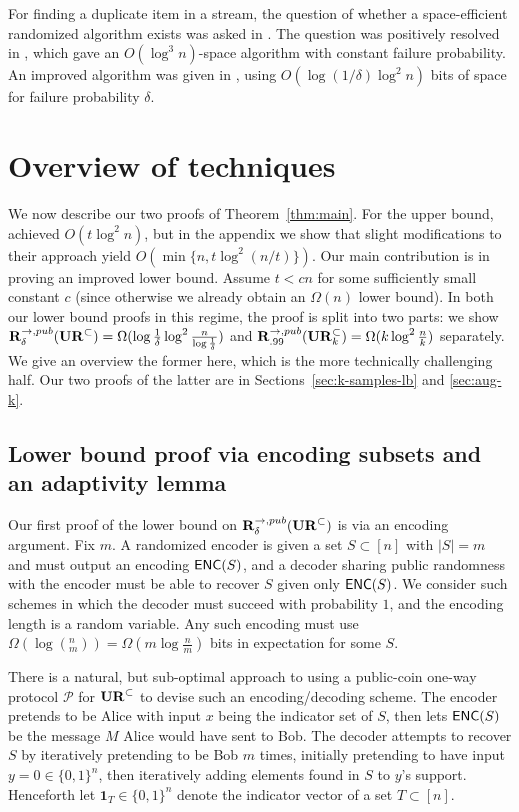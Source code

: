 For finding a duplicate item in a stream, the question of whether a space-efficient randomized algorithm exists was asked in \cite{Muthukrishnan05,Tarui07}. The question was positively resolved in \cite{GopalanR09}, which gave an $O(\log^3 n)$-space algorithm with constant failure probability. An improved algorithm was given in \cite{JowhariST11}, using $O(\log(1/\delta) \log^2 n)$ bits of space for failure probability $\delta$.

\vspace{-.1in}\section{Overview of techniques}\label{sec:overview}
We now describe our two proofs of Theorem~\ref{thm:main}. For the upper bound, \cite{JowhariST11} achieved $O(t\log^2n)$, but in the appendix we show that slight modifications to their approach yield $O(\min\{n,t\log^2(n/t)\})$. Our main contribution is in proving an improved lower bound. Assume $t < cn$ for some sufficiently small constant $c$ (since otherwise we already obtain an $\Omega(n)$ lower bound). In both our lower bound proofs in this regime, the proof is split into two parts: we show $\mathbf{R}^{\rightarrow,pub}_\delta(\mathbf{UR}^\subset) = \Omega(\log \frac 1{\delta}\log^2 \frac n{\log\frac 1{\delta}})$ and $\mathbf{R}^{\rightarrow,pub}_{.99}(\mathbf{UR}_k^\subset)=\Omega(k\log^2\frac nk)$ separately. We give an overview the former here, which is the more technically challenging half. Our two proofs of the latter are in Sections~\ref{sec:k-samples-lb} and \ref{sec:aug-k}.

\subsection{Lower bound proof via encoding subsets and an adaptivity lemma}\label{sec:adaptivity-intro}

Our first proof of the lower bound on $\mathbf{R}^{\rightarrow,pub}_\delta(\mathbf{UR}^\subset)$ is via an encoding argument. Fix $m$. A randomized encoder is given a set $S\subset[n]$ with $|S| = m$ and must output an encoding $\textsf{ENC}(S)$, and a decoder sharing public randomness with the encoder must be able to recover $S$ given only $\textsf{ENC}(S)$. We consider such schemes in which the decoder must succeed with probability $1$, and the encoding length is a random variable. Any such encoding must use $\Omega(\log(^n_m)) = \Omega(m\log \frac nm)$ bits in expectation for some $S$.

There is a natural, but sub-optimal approach to using a public-coin one-way protocol $\mathcal{P}$ for $\mathbf{UR}^\subset$ to devise such an encoding/decoding scheme.  The encoder pretends to be Alice with input $x$ being the indicator set of $S$, then lets $\textsf{ENC}(S)$ be the message $M$ Alice would have sent to Bob. The decoder attempts to recover $S$ by iteratively pretending to be Bob $m$ times, initially pretending to have input $y=0\in\{0,1\}^n$, then iteratively adding elements found in $S$ to $y$'s support. Henceforth let $\mathbf{1}_T\in\{0,1\}^n$ denote the indicator vector of a set $T\subset[n]$.

